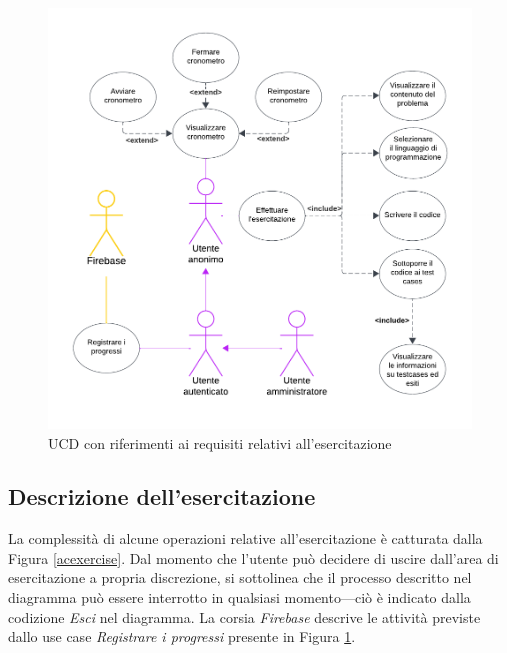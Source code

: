 \documentclass[11pt, a4paper]{article}
\theoremstyle{definition} %
\begin{document}
\begin{figure}[H]
\centering
\hspace*{-1.8cm}
\includegraphics[scale=0.94]{materiale/ucdiagrams/ucesercitazione.pdf}
\caption{UCD con riferimenti ai requisiti relativi all'esercitazione}
\label{esercitaz}
\end{figure}

\newpage
\subsection*{Descrizione dell'esercitazione}
La complessità di alcune operazioni relative all'esercitazione è
catturata dalla Figura \ref{acexercise}.
Dal momento che l'utente può decidere di uscire dall'area di esercitazione
a propria discrezione, si sottolinea che il processo descritto nel diagramma
può essere interrotto in qualsiasi momento—ciò è indicato dalla codizione
\textit{Esci} nel diagramma. La corsia \textit{Firebase} descrive le
attività previste dallo use case \textit{Registrare i progressi}
presente in Figura \ref{esercitaz}.
\end{document}
